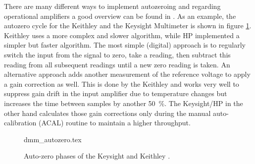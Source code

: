 There are many different ways to implement autozeroing and regarding operational amplifiers a good overview can be found in \cite{horowitz1989}. As an example, the autozero cycle for the Keithley  and the Keysight  Multimeter is shown in figure \ref{fig:dmm_autozero_comparison}. Keithley uses a more complex and slower algorithm, while HP implemented a simpler but faster algorithm. The most simple (digital) approach is to regularly switch the input from the signal to zero, take a reading, then subtract this reading from all subsequent readings until a new zero reading is taken. An alternative approach adds another measurement of the reference voltage to apply a gain correction as well. This is done by the Keithley  and works very well to suppress gain drift in the input amplifier due to temperature changes but increases the time between samples by another \qty{50}{\percent}. The Keysight/HP  in the other hand calculates those gain corrections only during the manual auto-calibration (ACAL) routine to maintain a higher throughput.
\begin{figure}[hb]
    \centering
        {dmm_autozero.tex}
    \caption{Auto-zero phases of the Keysight  and Keithley .}
    \label{fig:dmm_autozero_comparison}
\end{figure}


